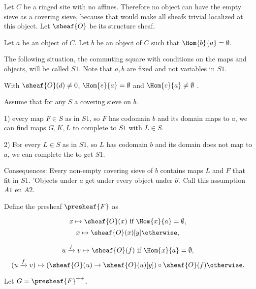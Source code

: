 

Let $C$ be a ringed site with no affines. 
Therefore no object can have the empty sieve as a covering sieve, because that would make all sheafs trivial localized at this object.
Let $\sheaf{O}$ be its structure sheaf.

Let $a$ be an object of $C$.
Let $b$ be an object of $C$ such that $\Hom{b}{a}=\emptyset$.

The following situation, the commuting square with conditions on the maps and objects, will be called $S1$.
Note that $a,b$ are fixed and not variables in $S1$. 

\begin{center}
\end{center}

With $\sheaf{O}(d)\neq 0$, $\Hom{e}{a}=\emptyset$ and $\Hom{c}{a}\neq\emptyset$ .

Assume that for any $S$ a covering sieve on $b$.

1) every map $F\in S$ as in $S1$, so $F$ has codomain $b$ and its domain maps to $a$,
we can find maps $G,K,L$ to complete to $S1$ with $L\in S$.

2) For every $L\in S$ as in $S1$, so $L$ has codomain $b$ and its domain does not map to $a$, we can complete the to get $S1$.

Consequences: Every non-empty covering sieve of $b$ contains maps $L$ and $F$ that fit in $S1$.
'Objects under $a$ get under every object under $b$'.
Call this assumption $A1$ en $A2$.

Define the presheaf $\presheaf{F}$ as

\[ x \mapsto \sheaf{O}(x) \mbox{ if } \Hom{x}{a}=\emptyset, \]
\[ x \mapsto \sheaf{O}(x)[y] \otherwise,\] 

\[ u \xrightarrow{f} v \mapsto \sheaf{O}(f) \mbox{ if } \Hom{x}{a}=\emptyset, \]
\[ (u \xrightarrow{f} v) \mapsto (\sheaf{O}(u) \rightarrow \sheaf{O}(u)[y]) \circ \sheaf{O}(f) \otherwise.\]

Let $G = \presheaf{F}^{++}$.



